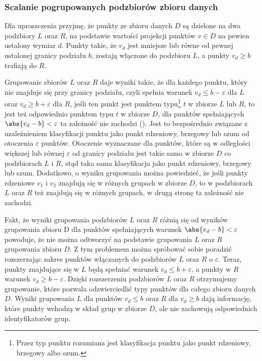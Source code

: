 \subsubsection*{Scalanie pogrupowanych podzbiorów zbioru danych}
Dla uproszczenia przyjmę, że punkty ze zbioru danych $ D $ są dzielone na dwa podzbiory $ L $ oraz $ R $, na podstawie wartości projekcji punktów $ v \in D $ na pewien ustalony wymiar $ d $. Punkty takie, że $ v_d $ jest mniejsze lub równe od pewnej ustalonej granicy podziału $ b $, zostają włączone do podzbioru $ L $, a punkty $ v_d \ge b $ trafiają do $ R $.

Grupowanie zbiorów $ L $ oraz $ R $ daje wyniki takie, że dla każdego punktu, który nie znajduje się przy granicy podziału, czyli spełnia warunek $ v_d \le b - \varepsilon $ dla $ L $ oraz $ v_d \ge b + \varepsilon $ dla $ R $, jeśli ten punkt jest punktem typu\footnote{Przez typ punktu rozumiana jest klasyfikacja punktu jako punkt rdzeniowy, brzegowy albo szum.} $ t $ w zbiorze $ L $ lub $ R $, to jest też odpowiednio punktem typu $ t $ w zbiorze $ D $, dla punktów spełniających $ \abs{v_d - b} < \varepsilon  $ ta zależność nie zachodzi (). Jest to bezpośrednio związane z uzależnieniem klasyfikacji punktu jako punkt rdzeniowy, brzegowy lub szum od otoczenia $ \varepsilon $ punktów. Otoczenie wyznaczane dla punktów, które są w odległości większej lub równej $ \varepsilon $ od granicy podziału jest takie samo w zbiorze $ D $ co podzbiorach $ L $ i $ R $, stąd taka sama klasyfikacja jako punkt rdzeniowy, brzegowy lub szum. Dodatkowo, o wyniku grupowania można powiedzieć, że jeśli punkty rdzeniowe $ v_1 $ i $ v_2 $ znajdują się w różnych grupach w zbiorze $ D $, to w podzbiorach $ L $ oraz $ R $ też znajdują się w różnych grupach, w drugą stronę ta zależność nie zachodzi.\par
Fakt, że wyniki grupowania podzbiorów $ L $ oraz $ R $ różnią się od wyników grupowania zbioru D dla punktów spełniających warunek $ \abs{v_d-b} < \varepsilon $ powoduje, że nie można odtworzyć na podstawie grupowania $ L $ oraz $ R $ grupowania zbioru $ D $. Z tym problemem można spróbować sobie poradzić rozszerzając zakres punktów włączanych do podzbiorów $ L $ oraz $ R $ o $ \varepsilon $. Teraz, punkty znajdujące się w $ L $ będą spełniać warunek $ v_d \le b + \varepsilon $, a punkty w $ R $ warunek $ v_d \ge b - \varepsilon $. Dzięki rozszerzeniu podzbiorów $ L $ oraz $ R $ otrzymujemy grupowanie, które pozwala odzwierciedlić typy punktów dla całego zbioru danych $ D $. Wyniki grupowania $ L $ dla punktów $ v_d \le b $ oraz $ R $ dla $ v_d \ge b $ dają informację, które punkty wchodzą w skład grup w zbiorze $ D $, ale nie zachowują odpowiednich identyfikatorów grup.\par
